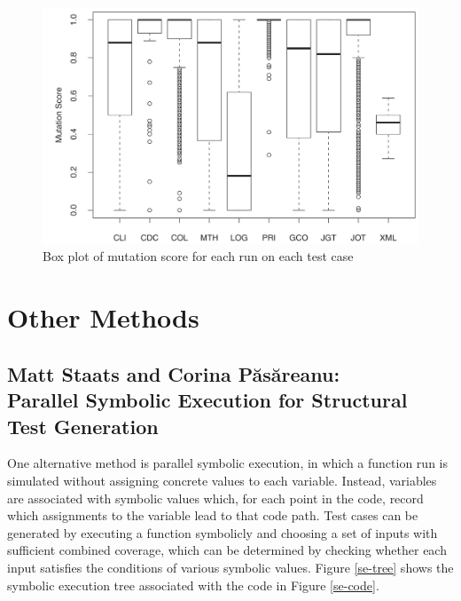 \documentclass{sig-alternate-05-2015}
\begin{document}
\begin{figure}
\center
\includegraphics[scale=0.25]{fz-plot.png}
\caption{Box plot of mutation score for each run on each test case}
\label{fz-plot}
\end{figure}

\section{Other Methods}

\subsection{Matt Staats and Corina P\u{a}s\u{a}reanu: \\Parallel Symbolic
            Execution for Structural Test Generation}

One alternative method is parallel symbolic execution, in which a function run
is simulated without assigning concrete values to each variable. Instead,
variables are associated with symbolic values which, for each point in the
code, record which assignments to the variable lead to that code path. Test
cases can be generated by executing a function symbolicly and choosing a set
of inputs with sufficient combined coverage, which can be determined by
checking whether each input satisfies the conditions of various symbolic
values. Figure \ref{se-tree} shows the symbolic execution tree associated with
the code in Figure \ref{se-code}.
\end{document}
